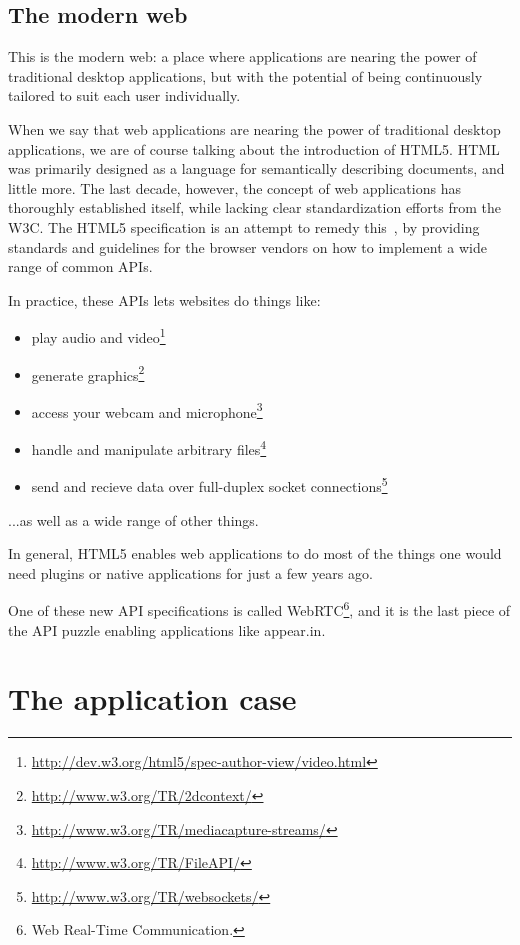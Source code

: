 \subsection{The modern web}
\label{sub:the_modern_web}

This is the modern web: a place where applications are nearing the power of traditional desktop applications, but with the potential of being continuously tailored to suit each user individually.

When we say that web applications are nearing the power of traditional desktop applications, we are of course talking about the introduction of HTML5. HTML was primarily designed as a language for semantically describing documents, and little more. The last decade, however, the concept of web applications has thoroughly established itself, while lacking clear standardization efforts from the W3C. The HTML5 specification is an attempt to remedy this~\cite{W3CHTML5_intro}, by providing standards and guidelines for the browser vendors on how to implement a wide range of common APIs.

In practice, these APIs lets websites do things like:

\begin{itemize}
    \item play audio and video\footnote{\url{http://dev.w3.org/html5/spec-author-view/video.html}}
    \item generate graphics\footnote{\url{http://www.w3.org/TR/2dcontext/}}
    \item access your webcam and microphone\footnote{\url{http://www.w3.org/TR/mediacapture-streams/}}
    \item handle and manipulate arbitrary files\footnote{\url{http://www.w3.org/TR/FileAPI/}}
    \item send and recieve data over full-duplex socket connections\footnote{\url{http://www.w3.org/TR/websockets/}}
\end{itemize}

...as well as a wide range of other things.

In general, HTML5 enables web applications to do most of the things one would need plugins or native applications for just a few years ago.

One of these new API specifications is called WebRTC\footnote{Web Real-Time Communication.}, and it is the last piece of the API puzzle enabling applications like appear.in.

\section{The application case}
\label{intro:sec:appearin}

